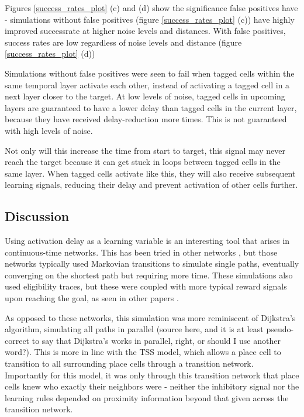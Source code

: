 \documentclass{article}
\begin{document}
    Figures \ref{success_rates_plot} (c) and (d) show the significance false positives have - simulations without false positives (figure \ref{success_rates_plot} (c)) have highly improved successrate at higher noise levels and distances. With false positives, success rates are low regardless of noise levels and distance (figure \ref{success_rates_plot} (d))

    Simulations without false positives were seen to fail when tagged cells within the same temporal layer activate each other, instead of activating a tagged cell in a next layer closer to the target. At low levels of noise, tagged cells in upcoming layers are guaranteed to have a lower delay than tagged cells in the current layer, because they have received delay-reduction more times. This is not guaranteed with high levels of noise.

    Not only will this increase the time from start to target, this signal may never reach the target because it can get stuck in loops between tagged cells in the same layer. When tagged cells activate like this, they will also receive subsequent learning signals, reducing their delay and prevent activation of other cells further.

    \subsection{Discussion}
    Using activation delay as a learning variable is an interesting tool that arises in continuous-time networks. This has been tried in other networks \parencite{Krichmar2022, Niedermeier2023}, but those networks typically used Markovian transitions to simulate single paths, eventually converging on the shortest path but requiring more time. These simulations also used eligibility traces, but these were coupled with more typical reward signals upon reaching the goal, as seen in other papers \parencite{Bellec2020}.

    As opposed to these networks, this simulation was more reminiscent of Dijkstra's algorithm, simulating all paths in parallel (source here, and it is at least pseudo-correct to say that Dijkstra's works in parallel, right, or should I use another word?). This is more in line with the TSS model, which allows a place cell to transition to all surrounding place cells through a transition network. Importantly for this model, it was only through this transition network that place cells knew who exactly their neighbors were - neither the inhibitory signal nor the learning rules depended on proximity information beyond that given across the transition network.
\end{document}
